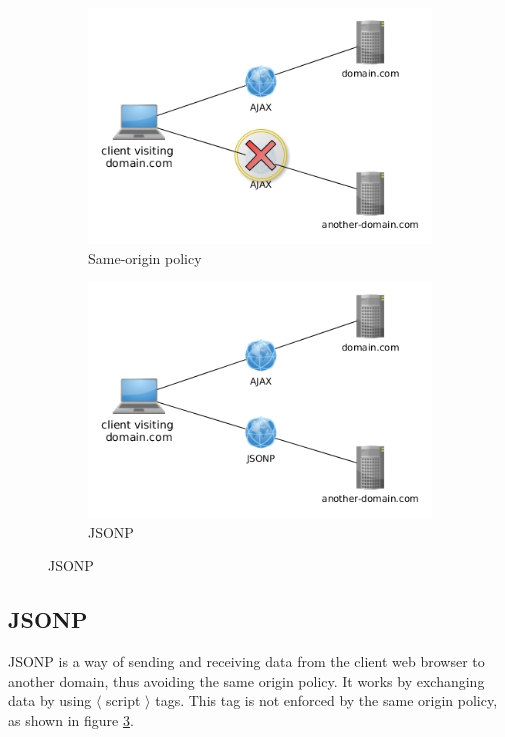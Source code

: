 \documentclass[10pt,a4paper]{article}
\begin{document}
\begin{figure}
\centering
\begin{subfigure}{0.45\textwidth}
\includegraphics[width=\textwidth]{../ajax/ajax}
\caption{Same-origin policy}
\label{fig:sameorigin}
\end{subfigure}
\begin{subfigure}{0.45\textwidth}
\includegraphics[width=\textwidth]{../jsonp/jsonp}
\caption{JSONP}
\label{fig:jsonp}
\end{subfigure}
\end{figure}

\subsection{JSONP}

JSONP is a way of sending and receiving data from the client web browser to another domain, thus avoiding the same origin policy. It works by exchanging data by using $\langle$ script $\rangle$ tags. This tag is not enforced by the same origin policy, as shown in figure \ref{fig:jsonp}.\cite{jsonp}
\end{document}
